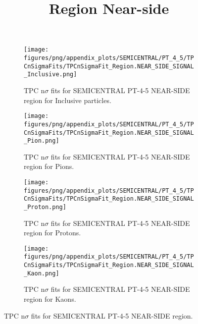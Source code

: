             \begin{figure}[H]
                \title{Region Near-side}
                \begin{subfigure}[b]{0.5\textwidth}
                    \centering
                    \texttt{[image: figures/png/appendix\_plots/SEMICENTRAL/PT\_4\_5/TPCnSigmaFits/TPCnSigmaFit\_Region.NEAR\_SIDE\_SIGNAL\_Inclusive.png]}
                    \caption{TPC n$\sigma$ fits for SEMICENTRAL PT-4-5 NEAR-SIDE region for Inclusive particles.}
                    \label{fig:appendix_SEMICENTRAL_PT-4-5_NEAR_SIDE_SIGNAL_Inclusive}
                \end{subfigure}
                \begin{subfigure}[b]{0.5\textwidth}
                    \centering
                    \texttt{[image: figures/png/appendix\_plots/SEMICENTRAL/PT\_4\_5/TPCnSigmaFits/TPCnSigmaFit\_Region.NEAR\_SIDE\_SIGNAL\_Pion.png]}
                    \caption{TPC n$\sigma$ fits for SEMICENTRAL PT-4-5 NEAR-SIDE region for Pions.}
                    \label{fig:appendix_SEMICENTRAL_PT-4-5_NEAR_SIDE_SIGNAL_Pion}
                \end{subfigure}
                \begin{subfigure}[b]{0.5\textwidth}
                    \centering
                    \texttt{[image: figures/png/appendix\_plots/SEMICENTRAL/PT\_4\_5/TPCnSigmaFits/TPCnSigmaFit\_Region.NEAR\_SIDE\_SIGNAL\_Proton.png]}
                    \caption{TPC n$\sigma$ fits for SEMICENTRAL PT-4-5 NEAR-SIDE region for Protons.}
                    \label{fig:appendix_SEMICENTRAL_PT-4-5_NEAR_SIDE_SIGNAL_Proton}
                \end{subfigure}
                \begin{subfigure}[b]{0.5\textwidth}
                    \centering
                    \texttt{[image: figures/png/appendix\_plots/SEMICENTRAL/PT\_4\_5/TPCnSigmaFits/TPCnSigmaFit\_Region.NEAR\_SIDE\_SIGNAL\_Kaon.png]}
                    \caption{TPC n$\sigma$ fits for SEMICENTRAL PT-4-5 NEAR-SIDE region for Kaons.}
                    \label{fig:appendix_SEMICENTRAL_PT-4-5_NEAR_SIDE_SIGNAL_Kaon}
                \end{subfigure}
                \caption{TPC n$\sigma$ fits for SEMICENTRAL PT-4-5 NEAR-SIDE region.}
                \label{fig:appendix_SEMICENTRAL_PT-4-5_NEAR_SIDE_SIGNAL}
            \end{figure}
